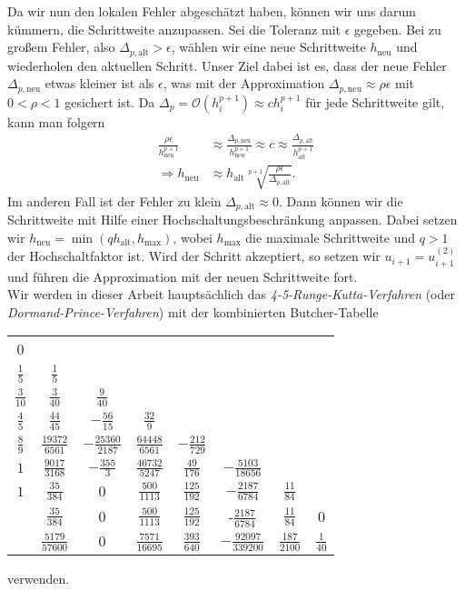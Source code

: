 Da wir nun den lokalen Fehler abgeschätzt haben, können wir uns darum kümmern, die Schrittweite anzupassen. Sei die
Toleranz mit $\epsilon$ gegeben. Bei zu großem Fehler, also $\Delta_{p, \text{alt}} > \epsilon$, wählen wir eine neue
Schrittweite $h_{\text{neu}}$ und wiederholen den aktuellen Schritt. Unser Ziel dabei ist es, dass der neue Fehler
$\Delta_{p, \text{neu}}$ etwas kleiner ist als $\epsilon$, was mit der Approximation
$\Delta_{p, \text{neu}} \approx \rho \epsilon$ mit $0 < \rho < 1$ gesichert ist. Da
$\Delta_p = \mathcal{O}(h_i^{p+1}) \approx ch_i^{p+1}$ für jede Schrittweite gilt, kann man folgern
\begin{align*}
    \frac{\rho \epsilon}{h_{\text{neu}}^{p+1}}
    &\approx \frac{\Delta_{p, \text{neu}}}{h_{\text{neu}}^{p+1}}
    \approx c
    \approx \frac{\Delta_{p, \text{alt}}}{h_{\text{alt}}^{p+1}}\\
    \Rightarrow h_{\text{neu}} &\approx h_{\text{alt}} \sqrt[p+1]{\frac{\rho \epsilon}{\Delta_{p, \text{alt}}}}.
\end{align*}
Im anderen Fall ist der Fehler zu klein $\Delta_{p, \text{alt}} \approx 0$. Dann können wir die Schrittweite mit Hilfe
einer Hochschaltungsbeschränkung anpassen. Dabei setzen wir $h_{\text{neu}} = \min(q h_{\text{alt}}, h_{\text{max}})$,
wobei $h_{\text{max}}$ die maximale Schrittweite und $q>1$ der Hochschaltfaktor ist. Wird der Schritt akzeptiert, so
setzen wir $u_{i+1} = u_{i+1}^{(2)}$ und führen die Approximation mit der neuen Schrittweite fort.\\
Wir werden in dieser Arbeit hauptsächlich das \textit{4-5-Runge-Kutta-Verfahren} (oder \textit{Dormand-Prince-Verfahren})
mit der kombinierten Butcher-Tabelle
\begin{center}
    \begin{tabular}{c | c c c c c c c}
        0 & & & & & & & \\
        $\frac{1}{5}$ & $\frac{1}{5}$ & & & & & & \\
        $\frac{3}{10}$ & $\frac{3}{40}$ & $\frac{9}{40}$ & & & & & \\
        $\frac{4}{5}$ & $\frac{44}{45}$ & $-\frac{56}{15}$ & $\frac{32}{9}$ & & & & \\
        $\frac{8}{9}$ & $\frac{19372}{6561}$ & $-\frac{25360}{2187}$ & $\frac{64448}{6561}$ & $-\frac{212}{729}$ & & & \\
        $1$ & $\frac{9017}{3168}$ & $-\frac{355}{3}$ & $\frac{46732}{5247}$ & $\frac{49}{176}$ & $-\frac{5103}{18656}$ & & \\
        $1$ & $\frac{35}{384}$ & $0$ & $\frac{500}{1113}$ & $\frac{125}{192}$ & $-\frac{2187}{6784}$ & $\frac{11}{84}$ & \\
        \hline
        & $\frac{35}{384}$ & $0$ & $\frac{500}{1113}$ & $\frac{125}{192}$ & -$\frac{2187}{6784}$ & $\frac{11}{84}$ & $0$\\
        \hline
        & $\frac{5179}{57600}$ &  $0$ & $\frac{7571}{16695}$ & $\frac{393}{640}$ & $-\frac{92097}{339200}$
        & $\frac{187}{2100}$ & $\frac{1}{40}$ \\
    \end{tabular}
\end{center}
verwenden.

